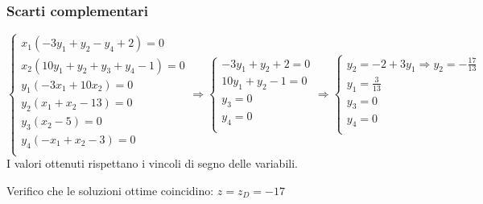 \documentclass[\main/main.tex]{subfiles}
\begin{document}
\subsubsection*{Scarti complementari}
\[
  \begin{cases}
    x_1(-3y_1 +y_2 -y_4   + 2) = 0      \\
    x_2(10y_1 + y_2 + y_3 +y_4 - 1) = 0 \\
    y_1(-3x_1 + 10x_2)= 0               \\
    y_2(x_1 + x_2     - 13)= 0          \\
    y_3(x_2           - 5 )= 0          \\
    y_4(-x_1 + x_2    - 3 )= 0          \\
  \end{cases}
  \Rightarrow
  \begin{cases}
    -3y_1 +y_2   + 2 = 0 \\
    10y_1 + y_2  - 1 = 0 \\
    y_3= 0               \\
    y_4= 0               \\
  \end{cases}
  \Rightarrow
  \begin{cases}
    y_2 = -2 + 3y_1 \Rightarrow y_2 = -\frac{17}{13} \\
    y_1 = \frac{3}{13}                               \\
    y_3= 0                                           \\
    y_4= 0                                           \\
  \end{cases}
\]
I valori ottenuti rispettano i vincoli di segno delle variabili.

Verifico che le soluzioni ottime coincidino: $z = z_D = -17$
\end{document}
